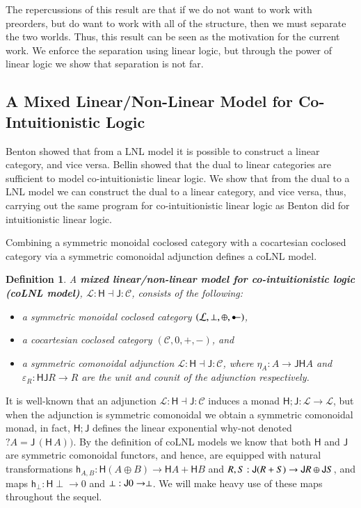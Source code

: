 \documentclass{lmcs}
\newtheorem{definition}[theorem]{Definition}
\let\mto\to
\let\to\relax
\newcommand{\to}{\rightarrow}
\let\j\relax
\newcommand{\cat}[1]{\mathcal{#1}}
\newcommand{\func}[1]{\mathsf{#1}}
\newcommand{\colimp}[0]{\multimapdotinv}
\newcommand{\h}[1]{\mathsf{h}_{#1}}
\newcommand{\j}[1]{\mathsf{j}_{#1}}
\begin{document}
The repercussions of this result are that if we do not want to work
with preorders, but do want to work with all of the structure, then we
must separate the two worlds.  Thus, this result can be seen as the
motivation for the current work.  We enforce the separation using
linear logic, but through the power of linear logic we show that
separation is not far.

\subsection{A Mixed Linear/Non-Linear Model for Co-Intuitionistic Logic}
\label{subsec:a_mixed_linear/non-linear_model_for_co-intuitionistic_logic}

Benton \cite{Benton:1994} showed that from a LNL model it is possible
to construct a linear category, and vice versa.  Bellin
\cite{Bellin:2012} showed that the dual to linear categories are
sufficient to model co-intuitionistic linear logic. We show that from
the dual to a LNL model we can construct the dual to a linear
category, and vice versa, thus, carrying out the same program for
co-intuitionistic linear logic as Benton did for intuitionistic linear
logic.

Combining a symmetric monoidal coclosed category with a cocartesian
coclosed category via a symmetric comonoidal adjunction defines a
coLNL model.
\begin{definition}
  \label{def:coLNL-model}
  A
  \textbf{mixed linear/non-linear model for co-intuitionistic logic (coLNL model)},
  $\cat{L} : \func{H} \dashv \func{J} : \cat{C}$, consists of the following:
  \begin{itemize}
  \item[i.] a symmetric monoidal coclosed category $(\cat{L},\perp,\oplus,\colimp)$,
  \item[ii.] a cocartesian coclosed category $(\cat{C},0,+,-)$, and
  \item[iv.] a symmetric comonoidal adjunction $\cat{L} : \func{H}
    \dashv \func{J} : \cat{C}$, where $\eta_A : A \mto
    \func{JH}A$ and $\varepsilon_R : \func{HJ}R \mto R$
    are the unit and counit of the adjunction respectively.
  \end{itemize}
\end{definition}
It is well-known that an adjunction $\cat{L} : \func{H} \dashv
\func{J} : \cat{C}$ induces a monad $\func{H};\func{J} : \cat{L} \mto
\cat{L}$, but when the adjunction is symmetric comonoidal we obtain a
symmetric comonoidal monad, in fact, $\func{H};\func{J}$ defines the
linear exponential why-not denoted $?A = \func{J}\,(\func{H}\,A))$.
By the definition of coLNL models we know that both $\func{H}$ and
$\func{J}$ are symmetric comonoidal functors, and hence, are equipped
with natural transformations $\h{A,B} : \func{H}(A \oplus B) \mto
\func{H}A + \func{H}B$ and $\j{R,S} : \func{J}(R + S) \mto \func{J}R
\oplus \func{J}S$, and maps $\h{\perp} : \func{H}\perp \mto 0$ and
$\j{\perp} : \func{J}0 \mto \perp$.  We will make heavy use of these
maps throughout the sequel.
\end{document}
